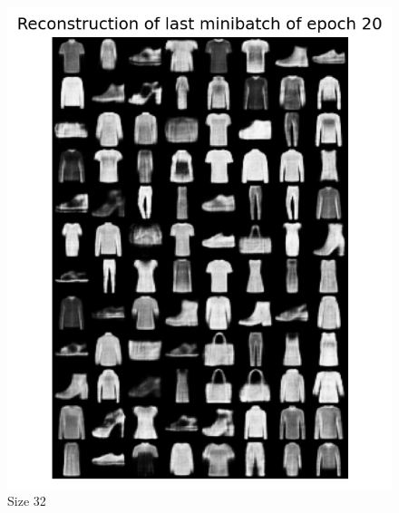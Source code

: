 \begin{enumerate}
 \begin{figure}[H]
   \centering
     \includegraphics[scale=0.6]
     {templates/re20_32}
     \caption{Size 32}
 \end{figure}


\end{enumerate}
